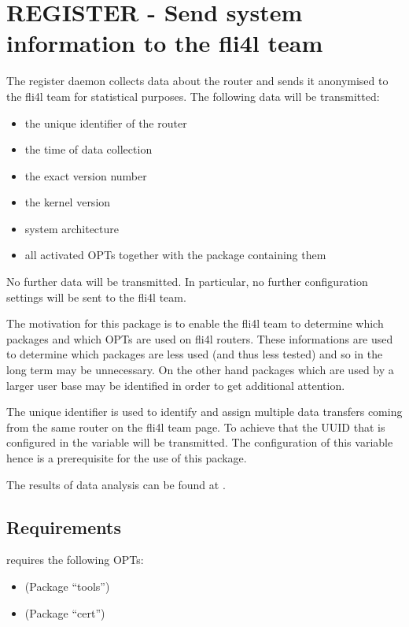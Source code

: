 \section{REGISTER - Send system information to the fli4l team}

The register daemon collects data about the router and sends it 
anonymised to the fli4l team for statistical purposes. The following data
will be transmitted:

\begin{itemize}
\item the unique identifier of the router
\item the time of data collection
\item the exact version number
\item the kernel version
\item system architecture
\item all activated OPTs together with the package containing them
\end{itemize}

No further data will be transmitted. In particular, no further
configuration settings will be sent to the fli4l team.

The motivation for this package is to enable the fli4l team to determine which 
packages and which OPTs are used on fli4l routers. These informations are used
to determine which packages are less used (and thus less tested) and so in the
long term may be unnecessary. On the other hand packages which are used by a
larger user base may be identified in order to get additional attention.

The unique identifier is used to identify and assign multiple data transfers
coming from the same router on the fli4l team page. To achieve that the
UUID that is configured in the variable  will be transmitted.
The configuration of this variable hence is a prerequisite for the use of
this package.

The results of data analysis can be found
at .

\subsection{Requirements}

 requires the following OPTs:
\begin{itemize}
\item {} (Package ``tools'')
\item {} (Package ``cert'')
\end{itemize}

